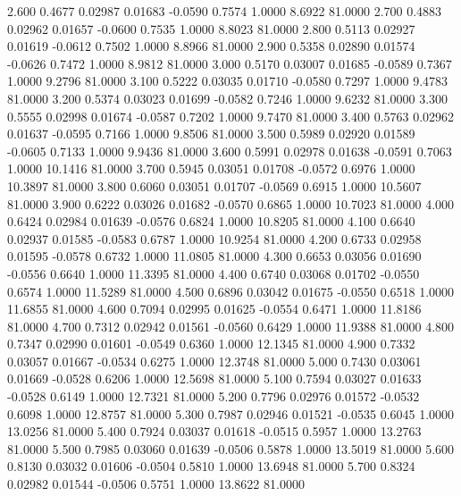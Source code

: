    2.600   0.4677   0.02987   0.01683  -0.0590   0.7574   1.0000   8.6922  81.0000
   2.700   0.4883   0.02962   0.01657  -0.0600   0.7535   1.0000   8.8023  81.0000
   2.800   0.5113   0.02927   0.01619  -0.0612   0.7502   1.0000   8.8966  81.0000
   2.900   0.5358   0.02890   0.01574  -0.0626   0.7472   1.0000   8.9812  81.0000
   3.000   0.5170   0.03007   0.01685  -0.0589   0.7367   1.0000   9.2796  81.0000
   3.100   0.5222   0.03035   0.01710  -0.0580   0.7297   1.0000   9.4783  81.0000
   3.200   0.5374   0.03023   0.01699  -0.0582   0.7246   1.0000   9.6232  81.0000
   3.300   0.5555   0.02998   0.01674  -0.0587   0.7202   1.0000   9.7470  81.0000
   3.400   0.5763   0.02962   0.01637  -0.0595   0.7166   1.0000   9.8506  81.0000
   3.500   0.5989   0.02920   0.01589  -0.0605   0.7133   1.0000   9.9436  81.0000
   3.600   0.5991   0.02978   0.01638  -0.0591   0.7063   1.0000  10.1416  81.0000
   3.700   0.5945   0.03051   0.01708  -0.0572   0.6976   1.0000  10.3897  81.0000
   3.800   0.6060   0.03051   0.01707  -0.0569   0.6915   1.0000  10.5607  81.0000
   3.900   0.6222   0.03026   0.01682  -0.0570   0.6865   1.0000  10.7023  81.0000
   4.000   0.6424   0.02984   0.01639  -0.0576   0.6824   1.0000  10.8205  81.0000
   4.100   0.6640   0.02937   0.01585  -0.0583   0.6787   1.0000  10.9254  81.0000
   4.200   0.6733   0.02958   0.01595  -0.0578   0.6732   1.0000  11.0805  81.0000
   4.300   0.6653   0.03056   0.01690  -0.0556   0.6640   1.0000  11.3395  81.0000
   4.400   0.6740   0.03068   0.01702  -0.0550   0.6574   1.0000  11.5289  81.0000
   4.500   0.6896   0.03042   0.01675  -0.0550   0.6518   1.0000  11.6855  81.0000
   4.600   0.7094   0.02995   0.01625  -0.0554   0.6471   1.0000  11.8186  81.0000
   4.700   0.7312   0.02942   0.01561  -0.0560   0.6429   1.0000  11.9388  81.0000
   4.800   0.7347   0.02990   0.01601  -0.0549   0.6360   1.0000  12.1345  81.0000
   4.900   0.7332   0.03057   0.01667  -0.0534   0.6275   1.0000  12.3748  81.0000
   5.000   0.7430   0.03061   0.01669  -0.0528   0.6206   1.0000  12.5698  81.0000
   5.100   0.7594   0.03027   0.01633  -0.0528   0.6149   1.0000  12.7321  81.0000
   5.200   0.7796   0.02976   0.01572  -0.0532   0.6098   1.0000  12.8757  81.0000
   5.300   0.7987   0.02946   0.01521  -0.0535   0.6045   1.0000  13.0256  81.0000
   5.400   0.7924   0.03037   0.01618  -0.0515   0.5957   1.0000  13.2763  81.0000
   5.500   0.7985   0.03060   0.01639  -0.0506   0.5878   1.0000  13.5019  81.0000
   5.600   0.8130   0.03032   0.01606  -0.0504   0.5810   1.0000  13.6948  81.0000
   5.700   0.8324   0.02982   0.01544  -0.0506   0.5751   1.0000  13.8622  81.0000
